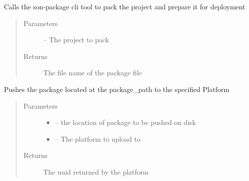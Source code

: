 \documentclass[letterpaper,10pt,english]{sphinxmanual}
\begin{document}
\begin{fulllineitems}
\label{_source/son_editor.util:son_editor.util.publishutil.pack_project}
Calls the son-package cli tool to pack the project and prepare it for deployment
\begin{quote}\begin{description}
\item[{Parameters}] \leavevmode
{} -- The project to pack

\item[{Returns}] \leavevmode
The file name of the package file

\end{description}\end{quote}

\end{fulllineitems}


\begin{fulllineitems}
\label{_source/son_editor.util:son_editor.util.publishutil.push_to_platform}
Pushes the package located at the package\_path to the specified Platform
\begin{quote}\begin{description}
\item[{Parameters}] \leavevmode\begin{itemize}
\item {} 
 -- the location of package to be pushed on disk

\item {} 
 -- The platform to upload to

\end{itemize}

\item[{Returns}] \leavevmode
The uuid returned by the platform

\end{description}\end{quote}

\end{fulllineitems}
\end{document}

